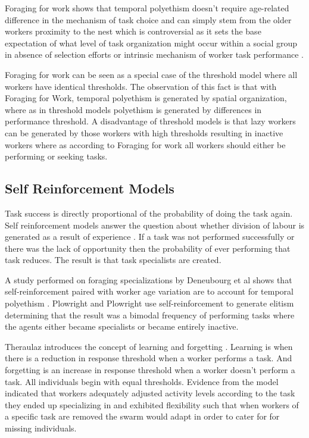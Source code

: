 Foraging for work shows that temporal polyethism doesn't require age-related difference in the mechanism of task choice and can simply stem from the older workers proximity to the nest which is controversial as it sets the base expectation of what level of task organization might occur within a social group in absence of selection efforts or intrinsic mechanism of worker task performance \cite{franks1994foraging}.

Foraging for work can be seen as a special case of the threshold model where all workers have identical thresholds. The observation of this fact is that with Foraging for Work, temporal polyethism is generated by spatial organization, where as in threshold models polyethism is generated by differences in performance threshold. A disadvantage of threshold models is that lazy workers can be generated by those workers with high thresholds resulting in inactive workers where as according to Foraging for work all workers should either be performing or seeking tasks.

\subsection{Self Reinforcement Models}
\label{selfreinforcement}

Task success is directly proportional of the probability of doing the task again. Self reinforcement models answer the question about whether division of labour is generated as a result of experience \cite{lerman2005review}. If a task was not performed successfully or there was the lack of opportunity then the probability of ever performing that task reduces. The result is that task specialists are created. 

A study performed on foraging specializations by Deneubourg et al shows that self-reinforcement paired with worker age variation are to account for temporal polyethism \cite{deneubourg1987self}. Plowright and Plowright use self-reinforcement to generate elitism \cite{plowright1988elitism} determining that the result was a bimodal frequency of performing tasks where the agents either became specialists or became entirely inactive.

Theraulaz introduces the concept of learning and forgetting \cite{theraulaz1998response}. Learning is when there is a reduction in response threshold when a worker performs a task. And forgetting is an increase in response threshold when a worker doesn't perform a task. All individuals begin with equal thresholds. Evidence from the model indicated that workers adequately adjusted activity levels according to the task they ended up specializing in and exhibited flexibility such that when workers of a specific task are removed the swarm would adapt in order to cater for for missing individuals. 

